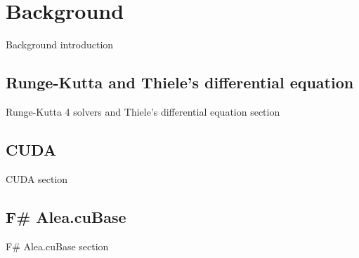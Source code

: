 \section{Background}
Background introduction
\subsection{Runge-Kutta and Thiele's differential equation}
Runge-Kutta 4 solvers and Thiele's differential equation section\cite{actulus}
\subsection{CUDA}
CUDA section
\subsection{F\# Alea.cuBase}
F\# Alea.cuBase section